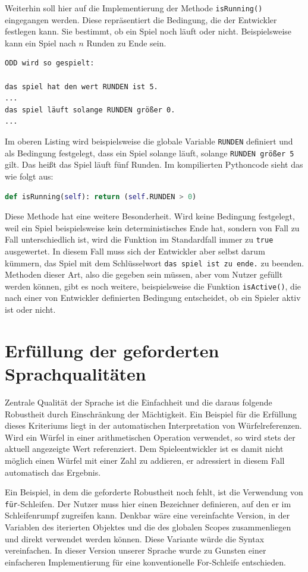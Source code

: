 	Weiterhin soll hier auf die Implementierung der Methode \texttt{isRunning()} eingegangen werden. Diese repräsentiert die Bedingung, die der Entwickler festlegen kann. Sie bestimmt, ob ein Spiel noch läuft oder nicht. Beispielsweise kann ein Spiel nach $n$ Runden zu Ende sein.
\begin{lstlisting}[label={lst:ODD}]
ODD wird so gespielt:

das spiel hat den wert RUNDEN ist 5.
...
das spiel läuft solange RUNDEN größer 0.
...
\end{lstlisting}
	Im oberen Listing wird beispielsweise die globale Variable \texttt{RUNDEN} definiert und als Bedingung festgelegt, dass ein Spiel solange läuft, solange \texttt{RUNDEN größer 5} gilt. Das heißt das Spiel läuft fünf Runden. Im kompilierten Pythoncode sieht das wie folgt aus:
\begin{lstlisting}[language=Python]
def isRunning(self): return (self.RUNDEN > 0)
\end{lstlisting}
	Diese Methode hat eine weitere Besonderheit. Wird keine Bedingung festgelegt, weil ein Spiel beispielsweise kein deterministisches Ende hat, sondern von Fall zu Fall unterschiedlich ist, wird die Funktion im Standardfall immer zu \texttt{true} ausgewertet. In diesem Fall muss sich der Entwickler aber selbst darum kümmern, das Spiel mit dem Schlüsselwort \texttt{das spiel ist zu ende.} zu beenden. Methoden dieser Art, also die gegeben sein müssen, aber vom Nutzer gefüllt werden können, gibt es noch weitere, beispielsweise die Funktion \texttt{isActive()}, die nach einer von Entwickler definierten Bedingung entscheidet, ob ein Spieler aktiv ist oder nicht.

\section{Erfüllung der geforderten Sprachqualitäten}
\label{sec:erfullung_der_geforderten_sprachqualitaten}
	Zentrale Qualität der Sprache ist die Einfachheit und die daraus folgende Robustheit durch Einschränkung der Mächtigkeit. Ein Beispiel für die Erfüllung dieses Kriteriums liegt in der automatischen Interpretation von Würfelreferenzen. Wird ein Würfel in einer arithmetischen Operation verwendet, so wird stets der aktuell angezeigte Wert referenziert. Dem Spieleentwickler ist es damit nicht möglich einen Würfel mit einer Zahl zu addieren, er adressiert in diesem Fall automatisch das Ergebnis.

	Ein Beispiel, in dem die geforderte Robustheit noch fehlt, ist die Verwendung von \texttt{für}-Schleifen. Der Nutzer muss hier einen Bezeichner definieren, auf den er im Schleifenrumpf zugreifen kann. Denkbar wäre eine vereinfachte Version, in der Variablen des iterierten Objektes und die des globalen Scopes zusammenliegen und direkt verwendet werden können. Diese Variante würde die Syntax vereinfachen. In dieser Version unserer Sprache wurde zu Gunsten einer einfacheren Implementierung für eine konventionelle For-Schleife entschieden.


